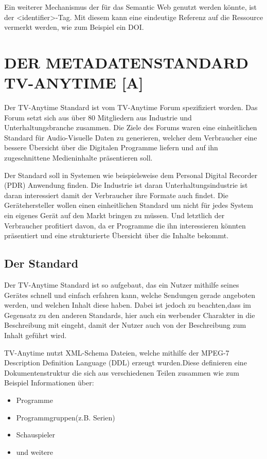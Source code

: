 	Ein weiterer Mechanismus der für das Semantic Web genutzt werden könnte, ist der <identifier>-Tag. Mit diesem kann eine eindeutige Referenz auf die Ressource vermerkt werden, wie zum Beispiel ein DOI.

	\section{DER METADATENSTANDARD TV-ANYTIME \hfill [A]}
	Der TV-Anytime Standard ist vom TV-Anytime Forum spezifiziert worden. Das Forum setzt sich aus über 80 Mitgliedern aus Industrie und Unterhaltungsbranche zusammen. Die Ziele des Forums waren eine einheitlichen Standard für Audio-Visuelle Daten zu generieren, welcher dem Verbraucher eine bessere Übersicht über die Digitalen Programme liefern und auf ihn zugeschnittene Medieninhalte präsentieren soll.
	
	Der Standard soll in Systemen wie beispielsweise dem Personal Digital Recorder (PDR) Anwendung finden. Die Industrie ist daran Unterhaltungsindustrie ist daran interessiert damit der Verbraucher ihre Formate auch findet. Die Gerätehersteller wollen einen einheitlichen Standard um nicht für jedes System ein eigenes Gerät auf den Markt bringen zu müssen. Und letztlich der Verbraucher profitiert davon, da er Programme die ihn interessieren könnten präsentiert und eine strukturierte Übersicht über die Inhalte bekommt.

\subsection{Der Standard}
	Der TV-Anytime Standard ist so aufgebaut, das ein Nutzer mithilfe seines Gerätes schnell und einfach erfahren kann, welche Sendungen gerade angeboten werden, und welchen Inhalt diese haben. Dabei ist jedoch zu beachten,dass im Gegensatz zu den anderen Standards, hier auch ein werbender Charakter in die Beschreibung mit eingeht, damit der Nutzer auch von der Beschreibung zum Inhalt geführt wird.
	
	TV-Anytime nutzt XML-Schema Dateien, welche mithilfe der MPEG-7 Description Definition Language (DDL) erzeugt wurden.Diese definieren eine Dokumentenstruktur die sich aus verschiedenen Teilen zusammen wie zum Beispiel Informationen über:
	\begin{itemize}
		\item Programme
		\item Programmgruppen(z.B. Serien)
		\item Schauspieler
		\item und weitere
	\end{itemize}

